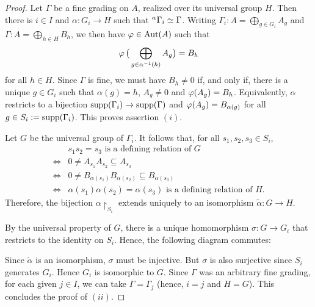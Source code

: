 \begin{proof}
	Let $\Gamma$ be a fine grading on $A$, realized over its universal group $H$. Then there is $i\in I$ and $\alpha: G_i \to H$ such that ${}^\alpha \Gamma_i \simeq \Gamma$. Writing $\Gamma_i: A = \bigoplus_{g\in G_i} A_g$ and $\Gamma: A = \bigoplus_{h\in H} B_h$, we then have $\varphi \in \operatorname{Aut}(A)$ such that
	\[
		\varphi\,\big( \bigoplus_{g\in \alpha^{-1} (h)} A_g \big) = B_h
	\]
	for all $h\in H$. Since $\Gamma$ is fine, we must have $B_h \neq 0$ if, and only if, there is a unique $g\in G_i$ such that $\alpha(g) = h$, $A_g\neq 0$ and $\varphi(A_g) = B_h$. Equivalently, $\alpha$ restricts to a bijection $\operatorname{supp}(\Gamma_i) \to \operatorname{supp}(\Gamma)$ and $\varphi(A_g) = B_{\alpha(g)}$ for all $g \in S_i:= \operatorname{supp} (\Gamma_i)$. This proves assertion $(i)$.

	Let $G$ be the universal group of $\Gamma_i$. It follows that, for all $s_1, s_2, s_3 \in S_i$,
	\begin{equation*} \label{eq:relations-unvrsl-grp}
		\begin{split}
			& s_1s_2 = s_3 \text{ is a defining relation of } G \\
									 \iff & 0 \neq A_{s_1} A_{s_2} \subseteq A_{s_3}\\
									 \iff & 0 \neq B_{\alpha(s_1)} B_{\alpha(s_2)} \subseteq B_{\alpha (s_3)}\\
									 \iff & \alpha(s_1)\alpha(s_2) = \alpha(s_3) \text{ is a defining relation of } H.
		\end{split}
	\end{equation*}
	Therefore, the bijection $\alpha\restriction_{S_i}$ extends uniquely to an isomorphism $\widetilde{\alpha}: G\rightarrow H$.

	By the universal property of $G$, there is a unique homomorphism $\sigma: G\to G_i$ that restricts to the identity on $S_i$. Hence, the following diagram commutes:
	\begin{center}
	\end{center}

	Since $\widetilde{\alpha}$ is an isomorphism, $\sigma$ must be injective. But $\sigma$ is also surjective since $S_i$ generates $G_i$. Hence $G_i$ is isomorphic to $G$. Since $\Gamma$ was an arbitrary fine grading, for each given $j\in I$, we can take $\Gamma = \Gamma_j$ (hence, $i=j$ and $H=G$). This concludes the proof of $(ii)$.
\end{proof}

